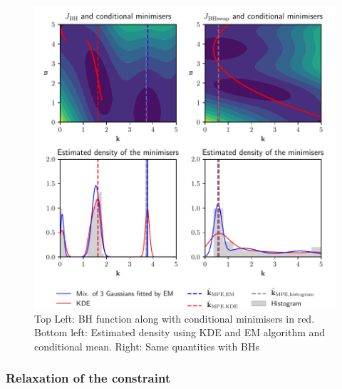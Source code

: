 \documentclass[npg, manuscript]{copernicus}
\begin{document}
\begin{figure}
  \includegraphics[width=12cm]{Figures/branin_side_66.pdf}
  \caption{Top Left: BH function along with conditional minimisers in red. Bottom left: Estimated density using KDE and EM algorithm and conditional mean. Right: Same quantities with BHs}
\label{fig:contours}
\end{figure}



\subsubsection{Relaxation of the constraint}
\end{document}
